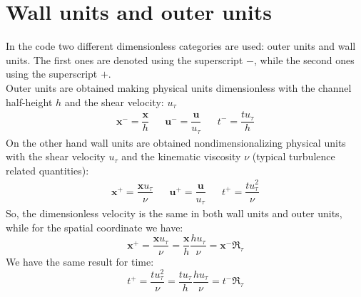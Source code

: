 \section{Wall units and outer units}
In the code two different dimensionless categories are used: outer units and wall units. The first ones are denoted using the superscript $-$, while the second ones using the superscript $+$. \\
Outer units are obtained making physical units dimensionless with the channel half-height $h$ and the shear velocity: $u_\tau$
\[
\begin{array}{ccccc}
\mathbf{x}^-=\dfrac{\mathbf{x}}{h} && \mathbf{u}^-=\dfrac{\mathbf{u}}{u_\tau} & &t^-=\dfrac{tu_\tau}{h}
\end{array}
\]
On the other hand wall units are obtained nondimensionalizing physical units with the shear velocity $u_\tau$ and the kinematic viscosity $\nu$ (typical turbulence related quantities):
\[
\begin{array}{ccccc}
\mathbf{x}^+=\dfrac{\mathbf{x}u_\tau}{\nu} && \mathbf{u}^+=\dfrac{\mathbf{u}}{u_\tau} & &t^+=\dfrac{tu_\tau^2}{\nu}
\end{array}
\]
So, the dimensionless velocity is the same in both wall units and outer units, while for the spatial coordinate we have:
\[
\mathbf{x}^+=\frac{\mathbf{x}u_\tau}{\nu}=\frac{\mathbf{x}}{h}\frac{hu_\tau}{\nu}=\mathbf{x}^- \Re_\tau
\]
We have the same result for time:
\[
t^+=\frac{tu_\tau^2}{\nu}=\frac{tu_\tau}{h}\frac{hu_\tau}{\nu}=t^-\Re_\tau
\]


